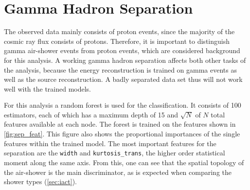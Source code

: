 \section{Gamma Hadron Separation}
%
The observed data mainly consists of proton events, since the majority of the
cosmic ray flux consists of protons. Therefore, it is important to distinguish
gamma air-shower events from proton events, which are considered background for
this analysis. A working gamma hadron separation affects both other tasks of the
analysis, because the energy reconstruction is trained on gamma events as well
as the source reconstruction. A badly separated data set thus will not work well
with the trained models.

For this analysis a random forest is used for the classification. It consists
of \num{100} estimators, each of which has a maximum depth of \num{15} and $\sqrt{N}$ of $N$ total features available at each node. The forest is trained on the features shown in \autoref{fig:sep_feat}.
This figure also shows the proportional importances of the single features
within the trained model. The most important features for the separation are
the \texttt{width} and \texttt{kurtosis\_trans}, the higher order statistical
moment along the same axis. From this, one can see that the spatial topology of
the air-shower is the main discriminator, as is expected when comparing the shower types (\autoref{sec:iact}).

